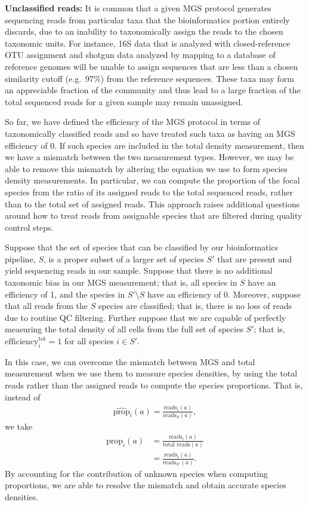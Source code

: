 \documentclass[
]{article}
\begin{document}
\textbf{Unclassified reads:} It is common that a given MGS protocol generates sequencing reads from particular taxa that the bioinformatics portion entirely discards, due to an inability to taxonomically assign the reads to the chosen taxonomic units.
For instance, 16S data that is analyzed with closed-reference OTU assignment and shotgun data analyzed by mapping to a database of reference genomes will be unable to assign sequences that are less than a chosen similarity cutoff (e.g.~97\%) from the reference sequences.
These taxa may form an appreciable fraction of the community and thus lead to a large fraction of the total sequenced reads for a given sample may remain unassigned.

So far, we have defined the efficiency of the MGS protocol in terms of taxonomically classified reads and so have treated such taxa as having an MGS efficiency of 0.
If such species are included in the total density measurement, then we have a mismatch between the two measurement types.
However, we may be able to remove this mismatch by altering the equation we use to form species density measurements.
In particular, we can compute the proportion of the focal species from the ratio of its assigned reads to the total sequenced reads, rather than to the total set of assigned reads.
This approach raises additional questions around how to treat reads from assignable species that are filtered during quality control steps.

Suppose that the set of species that can be classified by our bioinformatics pipeline, \(S\), is a proper subset of a larger set of species \(S'\) that are present and yield sequencing reads in our sample.
Suppose that there is no additional taxonomic bias in our MGS measurement; that is, all species in \(S\) have an efficiency of 1, and the species in \(S' \setminus S\) have an efficiency of 0.
Moreover, suppose that all reads from the \(S\) species are classified; that is, there is no loss of reads due to routine QC filtering.
Further suppose that we are capable of perfectly measuring the total density of all cells from the full set of species \(S'\); that is, \(\text{efficiency}^{\text{tot}}_{i} = 1\) for all species \(i \in S'\).

In this case, we can overcome the mismatch between MGS and total measurement when we use them to measure species densities, by using the total reads rather than the assigned reads to compute the species proportions.
That is, instead of
\begin{align}
  \widehat{\text{prop}}_{i}(a) = \frac{\text{reads}_i(a)}{\text{reads}_S(a)},
\end{align}
we take
\begin{align}
  \widehat{\text{prop}}_{i}(a) 
  &= \frac{\text{reads}_i(a)}{\text{total reads}(a)}
\\&= \frac{\text{reads}_i(a)}{\text{reads}_{S'}(a)}.
\end{align}
By accounting for the contribution of unknown species when computing proportions, we are able to resolve the mismatch and obtain accurate species densities.
\end{document}
